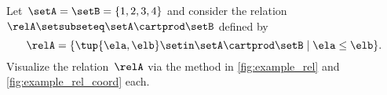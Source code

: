 \vfill
\begin{gradedexercise}
    \label{ex:visualize-leq-relation}
    Let~$\setA = \setB = \{1, 2, 3, 4 \}$ and consider the relation~$\relA \setsubseteq \setA \cartprod \setB$ defined by
    \begin{equation*}
        \relA = \{ \tup{\ela,\elb} \setin \setA \cartprod \setB \mid \ela \leq \elb \}.
    \end{equation*}
    Visualize the relation~$\relA$ via the method in \cref{fig:example_rel} and \cref{fig:example_rel_coord} each.
\end{gradedexercise}

